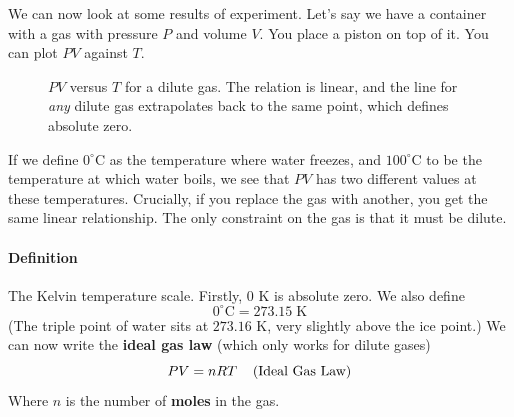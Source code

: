 \documentclass{report}
\numberwithin{equation}{section}
\begin{document}
\noindent We can now look at some results of experiment. Let's say we have a container with a gas with pressure $P$ and volume $V$. You place
a piston on top of it. You can plot $PV$ against $T$.

\begin{figure}[H]
\centering
{}
\caption{$PV$ versus $T$ for a dilute gas. The relation is linear, and the
line for \emph{any} dilute gas extrapolates back to the same point, which
defines absolute zero.}
\label{fig:PV_vs_T}
\end{figure}

\noindent If we define $0^{\circ}$C as the temperature where water freezes,
and $100^{\circ}$C to be the temperature at which water boils, we see that $PV$ has two different values at these temperatures. Crucially, if you replace
the gas with another, you get the same linear relationship. The only constraint on the gas is that it must be dilute.
\paragraph{Definition} The Kelvin temperature scale. Firstly, $0$ K is absolute zero. We also define
\begin{equation}
    0^{\circ}\text{C} = 273.15\;\text{K}
\end{equation}
(The triple point of water sits at $273.16$ K, very slightly above the ice point.)
We can now write the \textbf{ideal gas law} (which only works for dilute gases)
\begin{equation}
    PV = nRT \hspace{0.4cm}\text{(Ideal Gas Law)}
\end{equation}
Where $n$ is the number of \textbf{moles} in the gas.
\end{document}
